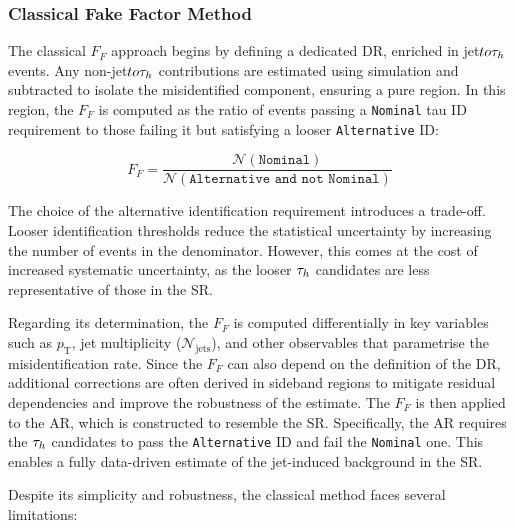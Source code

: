 \subsubsection{Classical Fake Factor Method}
\label{Section:Chapter6_FakeFactors_Classical}

The classical $F_F$ approach begins by defining a dedicated \ac{DR}, enriched in jet$to\tau_h$ events. Any non-jet$to\tau_h$ contributions are estimated using simulation and subtracted to isolate the misidentified component, ensuring a pure region. In this region, the $F_F$ is computed as the ratio of events passing a \texttt{Nominal} tau ID requirement to those failing it but satisfying a looser \texttt{Alternative} ID:

\begin{equation}
F_F = \frac{\mathcal{N}(\texttt{Nominal})}{\mathcal{N}(\texttt{Alternative and not Nominal})}
\end{equation}

The choice of the alternative identification requirement introduces a trade-off. Looser identification thresholds reduce the statistical uncertainty by increasing the number of events in the denominator. However, this comes at the cost of increased systematic uncertainty, as the looser $\tau_h$ candidates are less representative of those in the SR. 

Regarding its determination, the $F_F$ is computed differentially in key variables such as $p_\text{T}$, jet multiplicity ($\mathcal{N}_{\text{jets}}$), and other observables that parametrise the misidentification rate. Since the $F_F$ can also depend on the definition of the DR, additional corrections are often derived in sideband regions to mitigate residual dependencies and improve the robustness of the estimate. The $F_F$ is then applied to the \ac{AR}, which is constructed to resemble the SR. Specifically, the AR requires the $\tau_h$ candidates to pass the \texttt{Alternative} ID and fail the \texttt{Nominal} one. This enables a fully data-driven estimate of the jet-induced background in the SR.

Despite its simplicity and robustness, the classical method faces several limitations:

